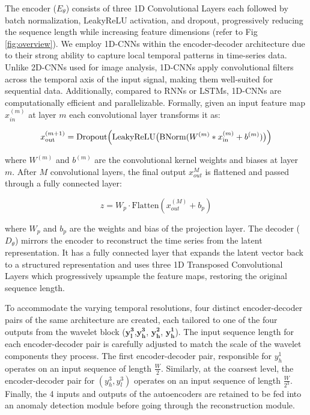 The encoder ($E_\theta$) consists of three 1D Convolutional Layers each followed by batch normalization, LeakyReLU
activation, and dropout, progressively reducing the sequence length while increasing feature dimensions (refer to Fig
\ref{fig:overview}). We employ 1D-CNNs within the encoder-decoder architecture due to their strong ability to capture local temporal patterns in time-series data. Unlike 2D-CNNs used for image analysis, 1D-CNNs apply convolutional filters across the temporal axis of the input signal, making them well-suited for sequential data.  Additionally, compared to RNNs or LSTMs, 1D-CNNs are computationally efficient and parallelizable. 
Formally, given an input feature map $x_{in}^{(m)}$ at layer $m$ each convolutional layer
transforms it as:

\begin{equation} 
x_{\text{out}}^{(m+1)} = \text{Dropout} \Big( \text{LeakyReLU} \big( \text{BNorm}
\\
(W^{(m)} \ast x_{\text{in}}^{(m)} + b^{(m)}) \big) \Big) \nonumber
\end{equation}

where $W^{(m)}$ and $b^{(m)}$ are the convolutional kernel weights and biases at layer $m$. After $M$ convolutional
layers, the final output $x_{out}^M$ is flattened and passed through a fully connected layer:

\begin{equation}
    z = W_p \cdot \text{Flatten}(x_{out}^{(M)} + b_p) \nonumber
\end{equation}

where $W_p$ and $b_p$ are the weights and bias of the projection layer. The decoder ($D_\theta$) mirrors the encoder to
reconstruct the time series from the latent representation. It has a fully connected layer that expands the latent
vector back to a structured representation and uses three 1D Transposed Convolutional Layers which progressively
upsample the feature maps, restoring the original sequence length.

To accommodate the varying temporal resolutions, four distinct encoder-decoder pairs of the same architecture are
created, each tailored to one of the four outputs from the wavelet block ($\mathbf{y_l^3}$,$\mathbf{y_h^3}$,
$\mathbf{y_h^2}$, $\mathbf{y_h^1}$). The input sequence length for each encoder-decoder pair is carefully adjusted to
match the scale of the wavelet components they process. The first encoder-decoder pair, responsible for $y_h^1$
operates on an input sequence of length $\frac{W}{2}$. Similarly, at the coarsest level, the encoder-decoder pair for
$(y_h^3,y_l^3)$ operates on an input sequence of length $\frac{W}{2^3}$.  Finally, the 4 inputs and outputs of the
autoencoders  are retained to be fed into an anomaly detection module before going through the reconstruction module. 

